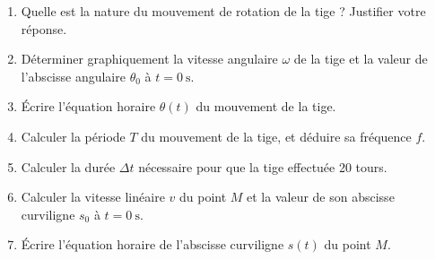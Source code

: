 \begin{enumerate}
    \item Quelle est la nature du mouvement de rotation de la tige ? Justifier
          votre réponse.
    \item Déterminer graphiquement la vitesse angulaire $\omega$ de la tige et
          la valeur de l'abscisse angulaire $\theta_{0}$ à $t=\qty{0}{\second}$.
    \item Écrire l'équation horaire $\theta(t)$ du mouvement de la tige.
    \item Calculer la période $T$ du mouvement de la tige, et déduire sa
          fréquence $f$.
    \item Calculer la durée $\Delta t$ nécessaire pour que la tige effectuée 20
          tours.
    \item Calculer la vitesse linéaire $v$ du point $M$ et la valeur de son
          abscisse curviligne $s_{0}$ à $t=\qty{0}{\second}$.
    \item Écrire l'équation horaire de l'abscisse curviligne $s(t)$ du point
          $M$.
\end{enumerate}


